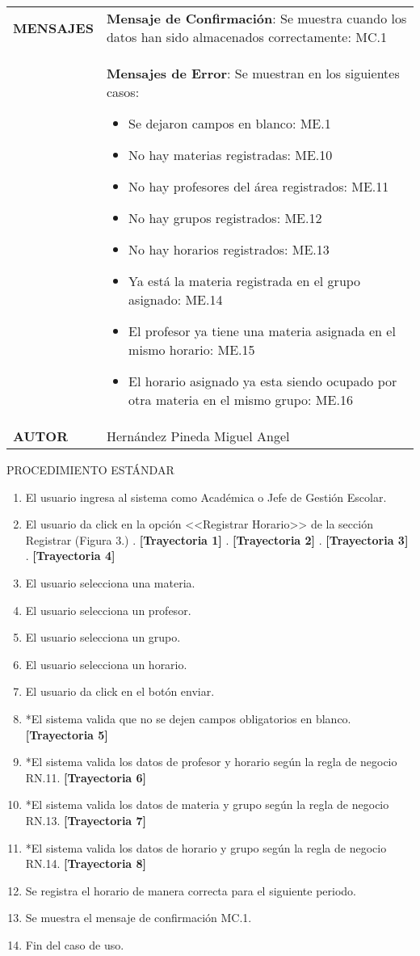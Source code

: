 \newpage
\begin{longtable}{ | p{6cm} | p{10cm} |}
\hline
\textbf{MENSAJES} & \textbf{Mensaje de Confirmación}: Se muestra cuando los datos han sido almacenados correctamente: MC.1\\ & \textbf{Mensajes de Error}: Se muestran en los siguientes casos: \begin{itemize}
    \item Se dejaron campos en blanco: ME.1
    \item No hay materias registradas: ME.10
    \item No hay profesores del área registrados: ME.11
    \item No hay grupos registrados: ME.12
    \item No hay horarios registrados: ME.13
    \item Ya está la materia registrada en el grupo asignado: ME.14
    \item El profesor ya tiene una materia asignada en el mismo horario: ME.15
    \item El horario asignado ya esta siendo ocupado por otra materia en el mismo grupo: ME.16
\end{itemize}\\
\hline
\textbf{AUTOR} & Hernández Pineda Miguel Angel\\
\hline
\end{longtable}
\vspace*{1cm}
\noindent
\Large{PROCEDIMIENTO ESTÁNDAR}
\large{}
\begin{enumerate}
    \item El usuario ingresa al sistema como Académica o Jefe de Gestión Escolar.
    \item El usuario da click en la opción <<Registrar Horario>> de la sección Registrar (Figura 3.) . \textbf{[Trayectoria 1]} . \textbf{[Trayectoria 2]} . \textbf{[Trayectoria 3]} . \textbf{[Trayectoria 4]}
    \item El usuario selecciona una materia.
    \item El usuario selecciona un profesor.
    \item El usuario selecciona un grupo.
    \item El usuario selecciona un horario.
    \item El usuario da click en el botón enviar.
    \item *El sistema valida que no se dejen campos obligatorios en blanco. \textbf{[Trayectoria 5]}
    \item *El sistema valida los datos de profesor y horario según la regla de negocio RN.11. \textbf{[Trayectoria 6]}
    \item *El sistema valida los datos de materia y grupo según la regla de negocio RN.13. \textbf{[Trayectoria 7]}
    \item *El sistema valida los datos de horario y grupo según la regla de negocio RN.14. \textbf{[Trayectoria 8]}
    \item Se registra el horario de manera correcta para el siguiente periodo.
    \item Se muestra el mensaje de confirmación MC.1.
    \item Fin del caso de uso.
\end{enumerate}
